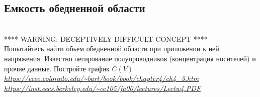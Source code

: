\documentclass[a4paper,12pt]{article} %
\begin{document}
  \subsection{Емкость обедненной области}\\
  **** WARNING:  DECEPTIVELY DIFFICULT CONCEPT ****\\

  Попытайтесь найти обьем обедненной области при приложении к ней напряжения. Известно легирование полупроводников (концентрация носителей) и прочие данные. Постройте график $C(V)$\\
  \textit{ \url{https://ecee.colorado.edu/~bart/book/book/chapter4/ch4_3.htm}}\\
  \textit{ \url{https://inst.eecs.berkeley.edu/~ee105/fa00/lectures/Lectw4.PDF}}



\end{document}
